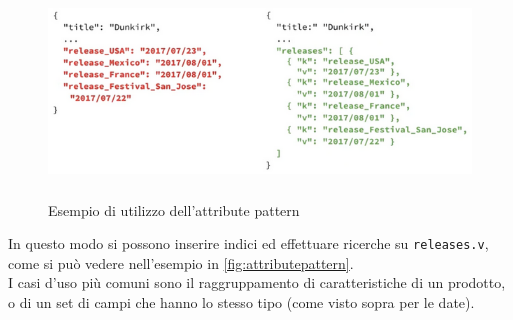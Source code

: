 \begin{figure}[htbp]
\begin{center}
\includegraphics[height=15em]{immagini/attribute-pattern.png}
\caption{Esempio di utilizzo dell'attribute pattern \cite{site:mongoDataModeling}}
\label{fig:attributepattern}
\end{center}
\end{figure}

\noindent In questo modo si possono inserire indici ed effettuare ricerche su \texttt{releases.v}, come si può vedere nell'esempio in \autoref{fig:attributepattern}.\\
I casi d'uso più comuni sono il raggruppamento di caratteristiche di un prodotto, o di un set di campi che hanno lo stesso tipo (come visto sopra per le date).

